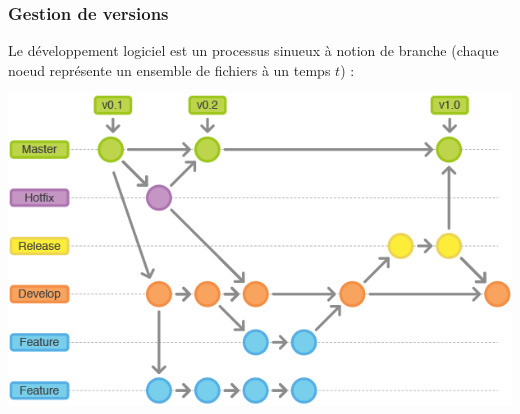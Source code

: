 \documentclass[table,tikz,12pt,svgnames]{beamer}
\begin{document}
\begin{frame}
	\frametitle{Gestion de versions}
	\vspace{-2.7em}
	\begin{block}{}
		\small Le développement logiciel est un processus sinueux à notion de \textcolor{title}{branche} (chaque noeud représente un \textcolor{title}{ensemble de fichiers} à un temps $t$) :
		\vspace{-1em}
		\begin{center}
		{\includegraphics[scale=0.48]{images/git_flow.png}}
		\end{center}
	\vspace{-4em}
	\end{block}
\end{frame}
\end{document}
